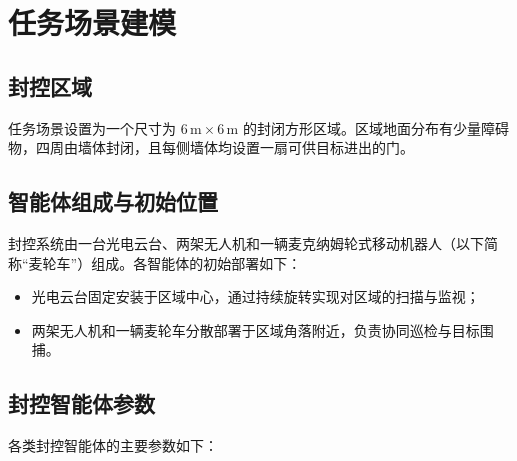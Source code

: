 \section{任务场景建模}

\subsection{封控区域}

任务场景设置为一个尺寸为 $6\,\mathrm{m}\times6\,\mathrm{m}$ 的封闭方形区域。区域地面分布有少量障碍物，四周由墙体封闭，且每侧墙体均设置一扇可供目标进出的门。

\subsection{智能体组成与初始位置}

封控系统由一台光电云台、两架无人机和一辆麦克纳姆轮式移动机器人（以下简称“麦轮车”）组成。各智能体的初始部署如下：

\begin{itemize}
    \item 光电云台固定安装于区域中心，通过持续旋转实现对区域的扫描与监视；
    \item 两架无人机和一辆麦轮车分散部署于区域角落附近，负责协同巡检与目标围捕。
\end{itemize}

\subsection{封控智能体参数}

各类封控智能体的主要参数如下：

